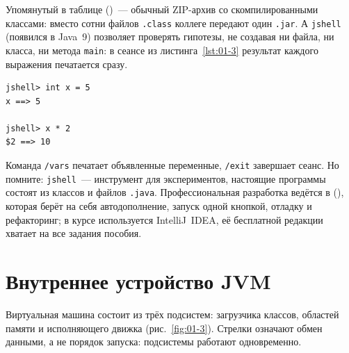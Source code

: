 Упомянутый в таблице  ()~--- обычный ZIP-архив
со скомпилированными классами: вместо сотни файлов \texttt{.class} коллеге
передают один \texttt{.jar}. А \texttt{jshell} (появился в Java~9) позволяет
проверять гипотезы, не создавая ни файла, ни класса, ни метода \texttt{main}: в
сеансе из листинга~\ref{lst:01-3} результат каждого выражения печатается сразу.

\begin{listing}[H]
\begin{verbatim}
jshell> int x = 5
x ==> 5

jshell> x * 2
$2 ==> 10
\end{verbatim}
\caption{Сеанс работы в jshell}
\label{lst:01-3}
\end{listing}

Команда \texttt{/vars} печатает объявленные переменные, \texttt{/exit} завершает
сеанс. Но помните: \texttt{jshell}~--- инструмент для экспериментов, настоящие
программы состоят из классов и файлов \texttt{.java}. Профессиональная
разработка ведётся в  (),
которая берёт на себя автодополнение, запуск одной кнопкой, отладку и
рефакторинг; в курсе используется IntelliJ~IDEA, её бесплатной редакции хватает
на все задания пособия.

\section{Внутреннее устройство JVM}

Виртуальная машина состоит из трёх подсистем: загрузчика классов, областей
памяти и исполняющего движка (рис.~\ref{fig:01-3}). Стрелки означают обмен
данными, а не порядок запуска: подсистемы работают одновременно.

